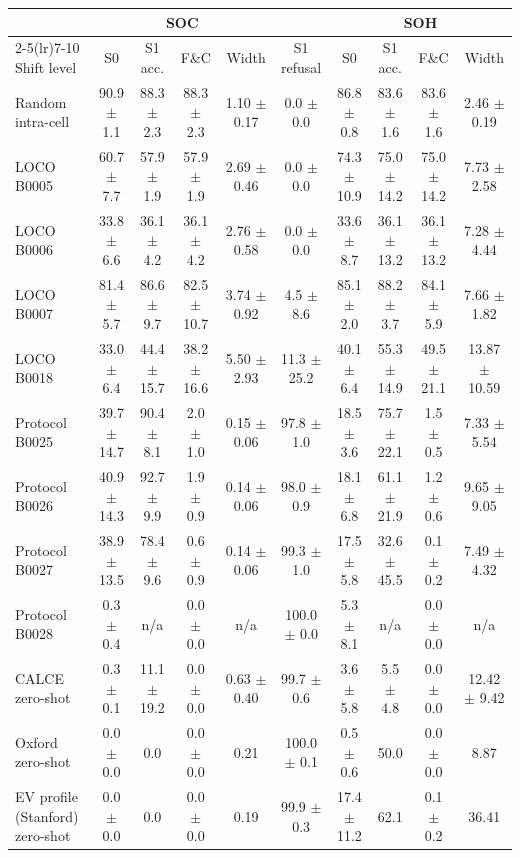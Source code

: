 \begin{tabular}{lccccccccc}
\toprule
& \multicolumn{4}{c}{SOC} & & \multicolumn{4}{c}{SOH} \\
\cmidrule(lr){2-5}\cmidrule(lr){7-10}
Shift level & S0 & S1 acc. & F\&C & Width & S1 refusal & S0 & S1 acc. & F\&C & Width \\
\midrule
Random intra-cell & 90.9 $\pm$ 1.1 & 88.3 $\pm$ 2.3 & 88.3 $\pm$ 2.3 & 1.10 $\pm$ 0.17 & 0.0 $\pm$ 0.0 & 86.8 $\pm$ 0.8 & 83.6 $\pm$ 1.6 & 83.6 $\pm$ 1.6 & 2.46 $\pm$ 0.19 \\
LOCO B0005 & 60.7 $\pm$ 7.7 & 57.9 $\pm$ 1.9 & 57.9 $\pm$ 1.9 & 2.69 $\pm$ 0.46 & 0.0 $\pm$ 0.0 & 74.3 $\pm$ 10.9 & 75.0 $\pm$ 14.2 & 75.0 $\pm$ 14.2 & 7.73 $\pm$ 2.58 \\
LOCO B0006 & 33.8 $\pm$ 6.6 & 36.1 $\pm$ 4.2 & 36.1 $\pm$ 4.2 & 2.76 $\pm$ 0.58 & 0.0 $\pm$ 0.0 & 33.6 $\pm$ 8.7 & 36.1 $\pm$ 13.2 & 36.1 $\pm$ 13.2 & 7.28 $\pm$ 4.44 \\
LOCO B0007 & 81.4 $\pm$ 5.7 & 86.6 $\pm$ 9.7 & 82.5 $\pm$ 10.7 & 3.74 $\pm$ 0.92 & 4.5 $\pm$ 8.6 & 85.1 $\pm$ 2.0 & 88.2 $\pm$ 3.7 & 84.1 $\pm$ 5.9 & 7.66 $\pm$ 1.82 \\
LOCO B0018 & 33.0 $\pm$ 6.4 & 44.4 $\pm$ 15.7 & 38.2 $\pm$ 16.6 & 5.50 $\pm$ 2.93 & 11.3 $\pm$ 25.2 & 40.1 $\pm$ 6.4 & 55.3 $\pm$ 14.9 & 49.5 $\pm$ 21.1 & 13.87 $\pm$ 10.59 \\
Protocol B0025 & 39.7 $\pm$ 14.7 & 90.4 $\pm$ 8.1 & 2.0 $\pm$ 1.0 & 0.15 $\pm$ 0.06 & 97.8 $\pm$ 1.0 & 18.5 $\pm$ 3.6 & 75.7 $\pm$ 22.1 & 1.5 $\pm$ 0.5 & 7.33 $\pm$ 5.54 \\
Protocol B0026 & 40.9 $\pm$ 14.3 & 92.7 $\pm$ 9.9 & 1.9 $\pm$ 0.9 & 0.14 $\pm$ 0.06 & 98.0 $\pm$ 0.9 & 18.1 $\pm$ 6.8 & 61.1 $\pm$ 21.9 & 1.2 $\pm$ 0.6 & 9.65 $\pm$ 9.05 \\
Protocol B0027 & 38.9 $\pm$ 13.5 & 78.4 $\pm$ 9.6 & 0.6 $\pm$ 0.9 & 0.14 $\pm$ 0.06 & 99.3 $\pm$ 1.0 & 17.5 $\pm$ 5.8 & 32.6 $\pm$ 45.5 & 0.1 $\pm$ 0.2 & 7.49 $\pm$ 4.32 \\
Protocol B0028 & 0.3 $\pm$ 0.4 & n/a & 0.0 $\pm$ 0.0 & n/a & 100.0 $\pm$ 0.0 & 5.3 $\pm$ 8.1 & n/a & 0.0 $\pm$ 0.0 & n/a \\
CALCE zero-shot & 0.3 $\pm$ 0.1 & 11.1 $\pm$ 19.2 & 0.0 $\pm$ 0.0 & 0.63 $\pm$ 0.40 & 99.7 $\pm$ 0.6 & 3.6 $\pm$ 5.8 & 5.5 $\pm$ 4.8 & 0.0 $\pm$ 0.0 & 12.42 $\pm$ 9.42 \\
Oxford zero-shot & 0.0 $\pm$ 0.0 & 0.0 & 0.0 $\pm$ 0.0 & 0.21 & 100.0 $\pm$ 0.1 & 0.5 $\pm$ 0.6 & 50.0 & 0.0 $\pm$ 0.0 & 8.87 \\
EV profile (Stanford) zero-shot & 0.0 $\pm$ 0.0 & 0.0 & 0.0 $\pm$ 0.0 & 0.19 & 99.9 $\pm$ 0.3 & 17.4 $\pm$ 11.2 & 62.1 & 0.1 $\pm$ 0.2 & 36.41 \\
\bottomrule
\end{tabular}
